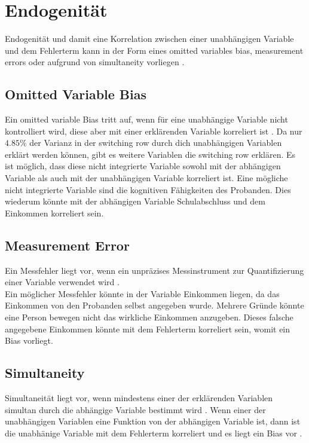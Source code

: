 \documentclass[11pt,a4paper]{article}
\begin{document}
\section{Endogenität}
Endogenität und damit eine Korrelation zwischen einer unabhängigen Variable und dem Fehlerterm kann in der Form eines omitted variables bias, measurement errors oder aufgrund von simultaneity vorliegen \parencite{wooldridge2010econometric}. 

\subsection{Omitted Variable Bias}
Ein omitted variable Bias tritt auf, wenn für eine unabhängige Variable nicht kontrolliert wird, diese aber mit einer erklärenden Variable korreliert ist \parencite{wooldridge2010econometric}. Da nur $4.85\%$ der Varianz in der switching row durch dich unabhängigen Variablen erklärt werden können, gibt es weitere Variablen die switching row erklären. Es ist möglich, dass diese nicht integrierte Variable sowohl mit der abhängigen Variable als auch mit der unabhängigen Variable korreliert ist. Eine mögliche nicht integrierte Variable sind die kognitiven Fähigkeiten des Probanden. Dies wiederum könnte mit der abhängigen Variable Schulabschluss und dem Einkommen korreliert sein.\\

\subsection{Measurement Error}
Ein Messfehler liegt vor, wenn ein unpräzises Messinstrument zur Quantifizierung einer Variable verwendet wird \parencite{wooldridge2015introductory}.\\

Ein möglicher Messfehler könnte in der Variable Einkommen liegen, da das Einkommen von den Probanden selbst angegeben wurde. Mehrere Gründe könnte eine Person bewegen nicht das wirkliche Einkommen anzugeben. Dieses falsche angegebene Einkommen könnte mit dem Fehlerterm korreliert sein, womit ein Bias vorliegt.\\
 


\subsection{Simultaneity}
Simultaneität liegt vor, wenn mindestens einer der erklärenden Variablen simultan durch die abhängige Variable bestimmt wird \parencite{wooldridge2010econometric}. Wenn einer der unabhängigen Variablen eine Funktion von der abhängigen Variable ist, dann ist die unabhänige Variable mit dem Fehlerterm korreliert und es liegt ein Bias vor \parencite{wooldridge2010econometric}.\\
\end{document}
